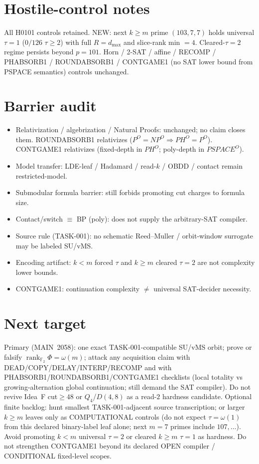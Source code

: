 \documentclass[11pt]{article}
\begin{document}
\section*{Hostile-control notes}
All H0101 controls retained. NEW: next $k{\ge}m$ prime $(103,7,7)$ holds universal
$\tau{=}1$ ($0/126$ $\tau{\ge}2$) with full $R{=}d_{\max}$ and slice-rank min $=4$.
Cleared-$\tau{=}2$ regime persists beyond $p{=}101$. Horn / 2-SAT / affine /
RECOMP / PHABSORB1 / ROUNDABSORB1 / CONTGAME1 (no SAT lower bound from PSPACE semantics)
controls unchanged.

\section*{Barrier audit}
\begin{itemize}
\item Relativization / algebrization / Natural Proofs: unchanged; no claim closes them.
  ROUNDABSORB1 relativizes ($P^O{=}NP^O\Rightarrow PH^O{=}P^O$).
  CONTGAME1 relativizes (fixed-depth in $PH^O$; poly-depth in $PSPACE^O$).
\item Model transfer: LDE-leaf / Hadamard / read-$k$ / OBDD / contact remain restricted-model.
\item Submodular formula barrier: still forbids promoting cut charges to formula size.
\item Contact/switch $\equiv$ BP (poly): does not supply the arbitrary-SAT compiler.
\item Source rule (TASK-001): no schematic Reed--Muller / orbit-window surrogate may be labeled SU/vMS.
\item Encoding artifact: $k{<}m$ forced $\tau$ and $k{\ge}m$ cleared $\tau{=}2$ are not complexity lower bounds.
\item CONTGAME1: continuation complexity $\neq$ universal SAT-decider necessity.
\end{itemize}

\section*{Next target}
Primary (MAIN~2058): one exact TASK-001-compatible SU/vMS orbit; prove or falsify
$\operatorname{rank}_{\mathbb F_2}\Phi=\omega(m)$; attack any acquisition claim with
DEAD/COPY/DELAY/INTERP/RECOMP and with PHABSORB1/ROUNDABSORB1/CONTGAME1 checklists
(local totality vs growing-alternation global continuation; still demand the SAT compiler).
Do not revive Idea~F cut$\ge48$ or $Q_4$/$D(4,8)$ as a read-$2$ hardness candidate.
Optional finite backlog: hunt smallest TASK-001-adjacent source transcription;
or larger $k{\ge}m$ leaves only as COMPUTATIONAL controls (do not expect $\tau=\omega(1)$
from this declared binary-label leaf alone; next $m{=}7$ primes include $107,\ldots$).
Avoid promoting $k{<}m$ universal $\tau{=}2$ or cleared $k{\ge}m$ $\tau{=}1$ as hardness.
Do not strengthen CONTGAME1 beyond its declared OPEN compiler / CONDITIONAL fixed-level scopes.
\end{document}

